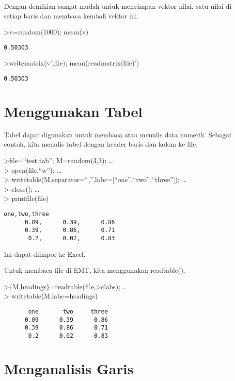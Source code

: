 \documentclass[
]{book}
\begin{document}
Dengan demikian sangat mudah untuk menyimpan vektor nilai, satu nilai di setiap baris dan membaca kembali vektor ini.

\textgreater v=random(1000); mean(v)

\begin{verbatim}
0.50303
\end{verbatim}

\textgreater writematrix(v',file); mean(readmatrix(file)')

\begin{verbatim}
0.50303
\end{verbatim}

\section{Menggunakan Tabel}\label{menggunakan-tabel}

Tabel dapat digunakan untuk membaca atau menulis data numerik. Sebagai contoh, kita menulis tabel dengan header baris dan kolom ke file.

\textgreater file=``test.tab''; M=random(3,3); \ldots{}\\
\textgreater{} open(file,``w''); \ldots{}\\
\textgreater{} writetable(M,separator=``,'',labc={[}``one'',``two'',``three''{]}); \ldots{}\\
\textgreater{} close(); \ldots{}\\
\textgreater{} printfile(file)

\begin{verbatim}
one,two,three
      0.09,      0.39,      0.86
      0.39,      0.86,      0.71
       0.2,      0.02,      0.83
\end{verbatim}

Ini dapat diimpor ke Excel.

Untuk membaca file di EMT, kita menggunakan readtable().

\textgreater\{M,headings\}=readtable(file,\textgreater clabs); \ldots{}\\
\textgreater{} writetable(M,labc=headings)

\begin{verbatim}
       one       two     three
      0.09      0.39      0.86
      0.39      0.86      0.71
       0.2      0.02      0.83
\end{verbatim}

\section{Menganalisis Garis}\label{menganalisis-garis}
\end{document}
